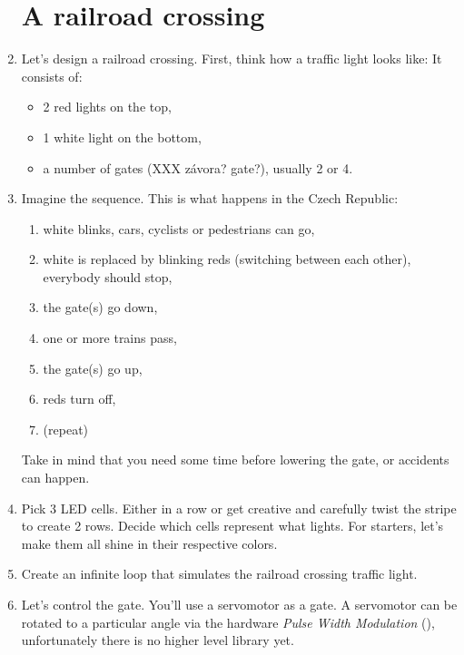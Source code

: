 \documentclass{../tutorial}
\begin{document}
\begin{enumerate}
\section{A railroad crossing}

\item
    Let's design a railroad crossing.
    First, think how a traffic light looks like:
    It consists of:

    \begin{itemize}
    \item 2 red lights on the top,
    \item 1 white light on the bottom,
    \item a number of gates (XXX závora? gate?), usually 2 or 4.
    \end{itemize}
      
\item
    Imagine the sequence. This is what happens in the Czech Republic:

    \begin{enumerate}
    \item white blinks, cars, cyclists or pedestrians can go,
    \item white is replaced by blinking reds
          (switching between each other),
          everybody should stop,
    \item the gate(s) go down,
    \item one or more trains pass,
    \item the gate(s) go up,
    \item reds turn off,
    \item (repeat)
    \end{enumerate}

    Take in mind that you need some time before lowering the gate,
    or accidents can happen.

\item
    Pick 3 LED cells.
    Either in a row or get creative and carefully twist the stripe to create 2 rows.
    Decide which cells represent what lights.
    For starters, let's make them all shine in their respective colors.

\item
    Create an infinite loop that simulates the railroad crossing traffic light.

\item
    Let's control the gate.
    You'll use a servomotor as a gate.
    A servomotor can be rotated to a particular angle via
    the hardware \emph{Pulse Width Modulation} (),
    unfortunately there is no higher level library yet.


\end{enumerate}
\end{document}
